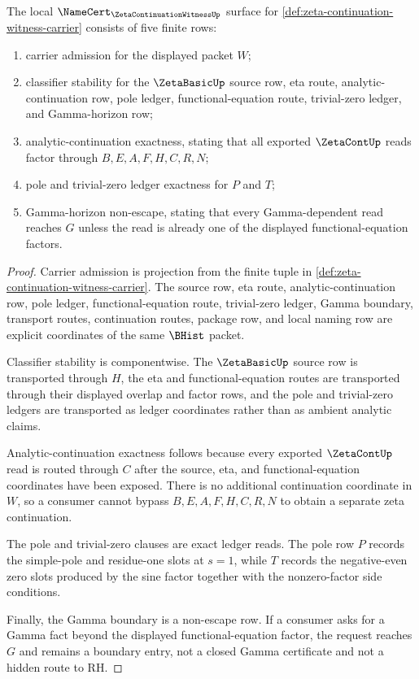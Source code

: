 \begin{theorem}
\label{thm:zeta-continuation-witness-namecert-obligation-surface}
The local $\NameCert_{\ZetaContinuationWitnessUp}$ surface for \autoref{def:zeta-continuation-witness-carrier} consists of five finite rows:
\begin{enumerate}
\item carrier admission for the displayed packet $W$;
\item classifier stability for the $\ZetaBasicUp$ source row, eta route, analytic-continuation row, pole ledger, functional-equation route, trivial-zero ledger, and Gamma-horizon row;
\item analytic-continuation exactness, stating that all exported $\ZetaContUp$ reads factor through $B,E,A,F,H,C,R,N$;
\item pole and trivial-zero ledger exactness for $P$ and $T$;
\item Gamma-horizon non-escape, stating that every Gamma-dependent read reaches $G$ unless the read is already one of the displayed functional-equation factors.
\end{enumerate}
\end{theorem}
\begin{proof}
Carrier admission is projection from the finite tuple in \autoref{def:zeta-continuation-witness-carrier}. The source row, eta route, analytic-continuation row, pole ledger, functional-equation route, trivial-zero ledger, Gamma boundary, transport routes, continuation routes, package row, and local naming row are explicit coordinates of the same $\BHist$ packet.

Classifier stability is componentwise. The $\ZetaBasicUp$ source row is transported through $H$, the eta and functional-equation routes are transported through their displayed overlap and factor rows, and the pole and trivial-zero ledgers are transported as ledger coordinates rather than as ambient analytic claims.

Analytic-continuation exactness follows because every exported $\ZetaContUp$ read is routed through $C$ after the source, eta, and functional-equation coordinates have been exposed. There is no additional continuation coordinate in $W$, so a consumer cannot bypass $B,E,A,F,H,C,R,N$ to obtain a separate zeta continuation.

The pole and trivial-zero clauses are exact ledger reads. The pole row $P$ records the simple-pole and residue-one slots at $s=1$, while $T$ records the negative-even zero slots produced by the sine factor together with the nonzero-factor side conditions.

Finally, the Gamma boundary is a non-escape row. If a consumer asks for a Gamma fact beyond the displayed functional-equation factor, the request reaches $G$ and remains a boundary entry, not a closed Gamma certificate and not a hidden route to RH.
\end{proof}

